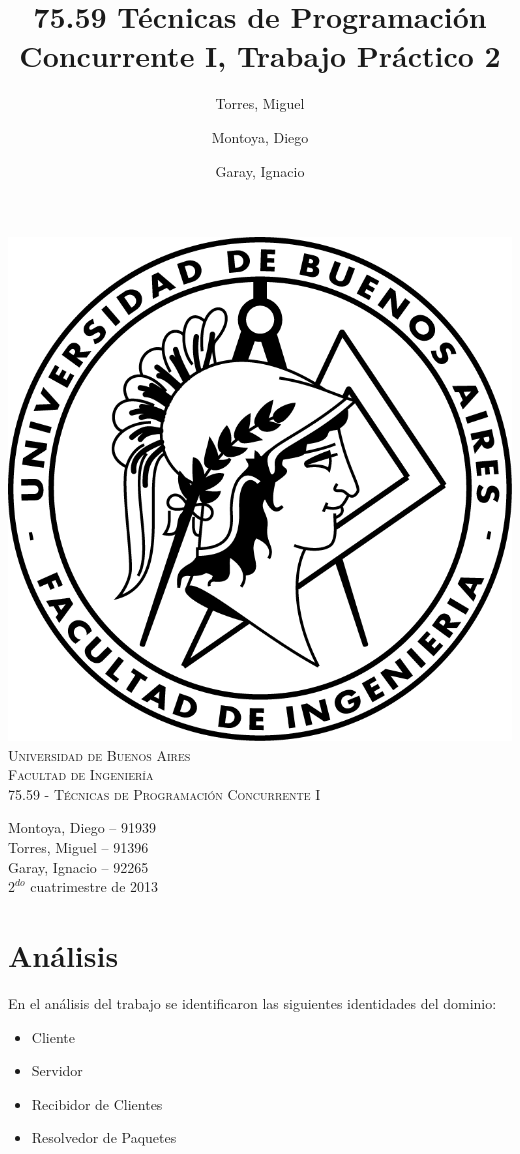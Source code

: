 \documentclass[a4paper,12pt,titlepage]{article}
\title{75.59 Técnicas de Programación Concurrente I, Trabajo Práctico 2}
\author{Torres, Miguel \and Montoya, Diego \and Garay, Ignacio}
\begin{document}
\thispagestyle{empty}
\begin{center}
\includegraphics{./logo-fiuba.png}\\
\vspace{1cm}
\textsc{\LARGE Universidad de Buenos Aires}\\[0.3cm]
\textsc{\LARGE Facultad de Ingenier\'ia}\\[1.2cm]
\textsc{\Large 75.59 - Técnicas de Programación Concurrente I}\\[0.3cm]
\end{center}

\begin{flushright}
{\large
Montoya, Diego -- 91939\\
Torres, Miguel -- 91396\\
Garay, Ignacio -- 92265\\
\vspace{2cm}
$2^{do}$ cuatrimestre de 2013}
\end{flushright}

\pagestyle{fancy}
\setcounter{page}{1}
\newpage

\tableofcontents
\newpage

\footnotesize
\section{Análisis}
En el análisis del trabajo se identificaron las siguientes identidades del dominio:\\
\begin{itemize}
\item Cliente
\item Servidor
\item Recibidor de Clientes
\item Resolvedor de Paquetes\\
\end{itemize} 
\end{document}
